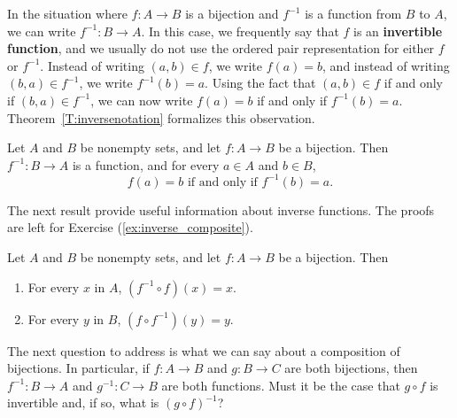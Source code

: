 In the situation where  $f: A \to B$  is a bijection and  $f^{-1} $ is a function from  $B$  to  $A$, we can write  $f^{-1} : B \to A$.  In this case, we frequently say that $f$  is an \textbf{invertible function},  and we usually do not use the ordered pair representation for either  $f$  or  $f^{-1} $.  Instead of writing  $( {a, b} ) \in f$, we write  $f( a ) = b$, and instead of writing  $( {b, a} ) \in f^{-1} $, we write  $f^{-1} ( b ) = a$.  Using the fact that  $( {a, b} ) \in f$  if and only if  $( {b, a} ) \in f^{-1} $, we can now write  $f( a ) = b$  if and only if  $f^{-1} ( b ) = a$.   Theorem~\ref{T:inversenotation} formalizes this observation.

\begin{theorem}  \label{T:inversenotation}
Let  $A$  and  $B$  be nonempty sets, and let  $f: A \to B$  be a bijection.  Then 
$f^{ - 1} : B \to A$ is a function, and for every  $a \in A$ and $b \in B$,
\[f( a ) = b  \text{ if and only if } f^{ - 1} ( b ) = a.\]
\end{theorem}

The next result provide useful information about inverse functions.  The proofs are left for Exercise (\ref{ex:inverse_composite}). 

\begin{corollary} \label{C:inversecomposition}
Let  $A$  and  $B$  be nonempty sets, and let  $f: A \to B$  be a bijection.  Then
\begin{enumerate}
\item For every $x$ in $A$, $\left( f^{ - 1}  \circ f \right)(x) = x$.
\label{C:inversecomposition1}
\item For every $y$ in $B$, $\left( f \circ f^{ - 1}\right)(y) = y$.
\label{C:inversecomposition2}
\end{enumerate}
\end{corollary}

The next question to address is what we can say about a composition of bijections. In particular, if $f: A \to B$  and  $g: B \to C$  are both bijections, then $f^{ - 1} : B \to A$  and  $g^{ - 1} : C \to B$ are both functions. Must it be the case that $g \circ f$ is invertible and, if so, what is $(g \circ f)^{-1}$? 

